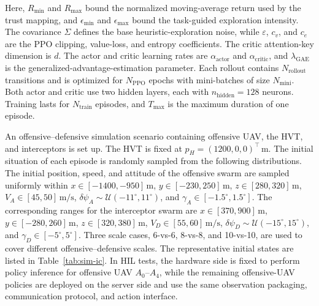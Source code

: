 \documentclass{cja}
\begin{document}
Here, $R_{\min}$ and $R_{\max}$ bound the normalized moving-average return used by the trust mapping, and $\epsilon_{\min}$ and $\epsilon_{\max}$ bound the task-guided exploration intensity. The covariance $\Sigma$ defines the base heuristic-exploration noise, while $\varepsilon$, $c_v$, and $c_e$ are the PPO clipping, value-loss, and entropy coefficients. The critic attention-key dimension is $d$. The actor and critic learning rates are $\alpha_{\mathrm{actor}}$ and $\alpha_{\mathrm{critic}}$, and $\lambda_{\mathrm{GAE}}$ is the generalized-advantage-estimation parameter. Each rollout contains $N_{\mathrm{rollout}}$ transitions and is optimized for $N_{\mathrm{PPO}}$ epochs with mini-batches of size $N_{\mathrm{mini}}$. Both actor and critic use two hidden layers, each with $n_{\mathrm{hidden}}=128$ neurons. Training lasts for $N_{\mathrm{train}}$ episodes, and $T_{\max}$ is the maximum duration of one episode.

An offensive--defensive simulation scenario containing offensive UAV, the HVT, and interceptors is set up. The HVT is fixed at $p_H=(1200,0,0)^\top\,\mathrm{m}$.
The initial situation of each episode is randomly sampled from the following distributions. The initial position, speed, and attitude of the offensive swarm are sampled uniformly within $x\in[-1400,-950]\,\mathrm{m}$, $y\in[-230,250]\,\mathrm{m}$, $z\in[280,320]\,\mathrm{m}$, $V_A\in[45,50]\,\mathrm{m/s}$, $\delta\psi_A\sim\mathcal{U}(-11^\circ,11^\circ)$, and $\gamma_A\in[-1.5^\circ,1.5^\circ]$. The corresponding ranges for the interceptor swarm are $x\in[370,900]\,\mathrm{m}$, $y\in[-280,260]\,\mathrm{m}$, $z\in[320,380]\,\mathrm{m}$, $V_D\in[55,60]\,\mathrm{m/s}$, $\delta\psi_D\sim\mathcal{U}(-15^\circ,15^\circ)$, and $\gamma_D\in[-5^\circ,5^\circ]$.
Three scale cases, 6-vs-6, 8-vs-8, and 10-vs-10, are used to cover different offensive--defensive scales. The representative initial states are listed in Table~\ref{tab:sim-ic}.
In HIL tests, the hardware side is fixed to perform policy inference for offensive UAV $A_0$--$A_4$, while the remaining offensive-UAV policies are deployed on the server side and use the same observation packaging, communication protocol, and action interface.
\end{document}
